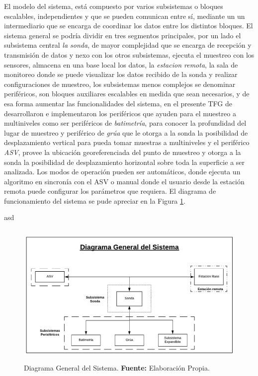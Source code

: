El modelo del sistema, está compuesto por varios subsistemas o bloques escalables, independientes y que se pueden comunican entre s\'i, mediante un un intermediario que se encarga de coordinar los datos entre los distintos bloques. El sistema general se podr\'ia dividir en tres segmentos principales, por un lado el subsistema central \textit{la sonda}, de mayor complejidad que se encarga de recepci\'on y transmisi\'on de datos y nexo con los otros subsistemas, ejecuta el muestreo con los sensores, almacena en una base local los datos, la \textit{estacion remota}, la sala de monitoreo donde se puede visualizar los datos recibido de la sonda y realizar configuraciones de muestreo, los subsistemas menos complejos se denominar perif\'ericos, son bloques auxiliares escalables en medida que sean necesarios, y de esa forma aumentar las funcionalidades del sistema, en el presente TFG de desarrollaron e implementaron los perif\'ericos que ayuden para el muestreo a multiniveles como ser perif\'ericos de \textit{batimetr\'ia}, para conocer la profundidad del lugar de muestreo y perif\'erico de \textit{gr\'ua} que le otorga a la sonda la posibilidad de desplazamiento vertical para pueda tomar muestras a multiniveles y el perif\'erico \textit{ASV}, provee la ubicaci\'on georeferenciada del punto de muestreo y otorga a la sonda la posibilidad de desplazamiento horizontal sobre toda la superficie a ser analizada. Los modos de operaci\'on pueden ser autom\'aticos, donde ejecuta un algoritmo en sincron\'ia con el ASV o manual donde el usuario desde la estaci\'on remota puede configurar los par\'ametros que requiera.  
El diagrama de funcionamiento del sistema se pude apreciar en la Figura \ref{fig:3.1}.

asd 
\begin{figure}[H]
    \centering
    \includegraphics[width=150mm, height=70mm]{Imagenes/2021/img31.pdf}
    \caption[Diagrama General del Sistema]{Diagrama General del Sistema. \textbf{Fuente:} Elaboración Propia.}
    \label{fig:3.1}
\end{figure}

